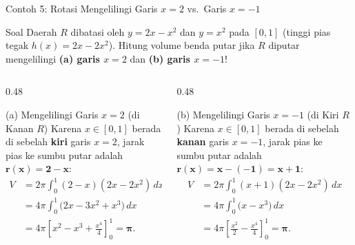 \documentclass[aspectratio=43,10pt]{beamer}
\begin{document}
\begin{frame}{Contoh 5: Rotasi Mengelilingi Garis $x = 2$ vs.\ Garis $x = -1$}
    \begin{exampleblock}{Soal}
        \scriptsize
        Daerah $R$ dibatasi oleh $y = 2x - x^2$ dan $y = x^2$ pada $[0, 1]$ (tinggi pias tegak $h(x) = 2x - 2x^2$). Hitung volume benda putar jika $R$ diputar mengelilingi \textbf{(a) garis $x = 2$} dan \textbf{(b) garis $x = -1$}!
    \end{exampleblock}

    \begin{columns}[T]
        \begin{column}{0.48\textwidth}
            \begin{block}{(a) Mengelilingi Garis $x = 2$ (di Kanan $R$)}
                \scriptsize\abovedisplayskip=2pt\belowdisplayskip=2pt
                Karena $x \in [0, 1]$ berada di sebelah \textbf{kiri} garis $x = 2$, jarak pias ke sumbu putar adalah $\mathbf{r(x) = 2 - x}$:
                \begin{align*}
                    V &= 2\pi\int_{0}^{1} (2 - x)(2x - 2x^2)\,dx\\
                    &= 4\pi\int_{0}^{1} \big(2x - 3x^2 + x^3\big)\,dx\\
                    &= 4\pi\left[x^2 - x^3 + \frac{x^4}{4}\right]_{0}^{1} = \mathbf{\pi}.
                \end{align*}
            \end{block}
        \end{column}

        \begin{column}{0.48\textwidth}
            \begin{alertblock}{(b) Mengelilingi Garis $x = -1$ (di Kiri $R$)}
                \scriptsize\abovedisplayskip=2pt\belowdisplayskip=2pt
                Karena $x \in [0, 1]$ berada di sebelah \textbf{kanan} garis $x = -1$, jarak pias ke sumbu putar adalah $\mathbf{r(x) = x - (-1) = x + 1}$:
                \begin{align*}
                    V &= 2\pi\int_{0}^{1} (x + 1)(2x - 2x^2)\,dx\\
                    &= 4\pi\int_{0}^{1} \big(x - x^3\big)\,dx\\
                    &= 4\pi\left[\frac{x^2}{2} - \frac{x^4}{4}\right]_{0}^{1} = \mathbf{\pi}.
                \end{align*}
            \end{alertblock}
        \end{column}
    \end{columns}
\end{frame}
\end{document}

